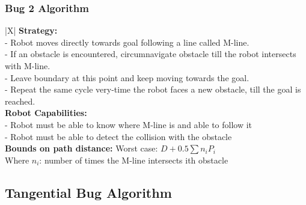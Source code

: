 \documentclass[handout]{beamer}
\begin{document}
\begin{frame}
  \frametitle{Bug 2 Algorithm}
  \centering
  \begin{scriptsize}
  \begin{table}
    \begin{tblr}{|X|}
      \hline
        \textbf{Strategy: } \\
        
           -  Robot moves directly towards goal following a line called M-line.\\
           -  If an obstacle is encountered, circumnavigate obstacle till the robot intersects with M-line.\\
           -  Leave boundary at this point and keep moving towards the goal.\\        
           -  Repeat the same cycle very-time the robot faces a new obstacle, till the goal is reached.\\
        
        \hline 
        \textbf{Robot Capabilities: } \\
         - Robot must be able to know where M-line is and able to follow it \\
         - Robot must be able to detect the collision with the obstacle \\
        \hline
        \textbf{Bounds on path distance:}
        Worst case: $D + 0.5\sum n_{i}P_{i}$\\
        Where $n_{i}$: number of times the M-line intersects ith obstacle \\
        \hline
    \end{tblr}
  \end{table}
\end{scriptsize}
\end{frame}

\subsection[Tangential Bug]{Tangential Bug Algorithm}
\end{document}
